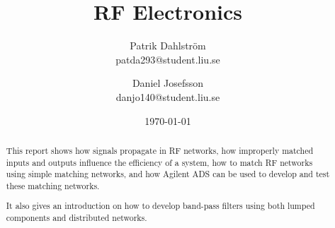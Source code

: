 \documentclass[12pt]{article}
\title{RF Electronics}
\author{
        Patrik Dahlström \\
        patda293@student.liu.se \\
            \and
        Daniel Josefsson\\
        danjo140@student.liu.se
}
\date{\today}
\begin{document}
\renewcommand\thepage{}
\maketitle

\vspace{\fill}

\begin{abstract}
This report shows how signals propagate in RF networks, how improperly matched inputs and outputs influence the efficiency of a system, how to match RF networks using simple matching networks, and how Agilent ADS can be used to develop and test these matching networks.

It also gives an introduction on how to develop band-pass filters using both lumped components and distributed networks.
\end{abstract}

\newpage
\tableofcontents
\newpage
\renewcommand\thepage{\arabic{page}}
\setcounter{page}{1}










\end{document}
